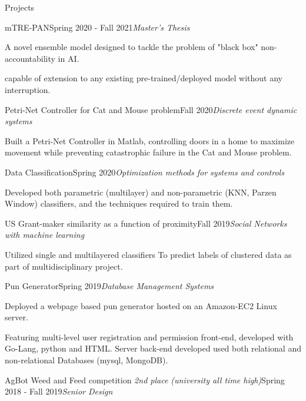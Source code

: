 \documentclass{resume}
\begin{document}



% 
% 
\begin{rSection}{Projects}
\begin{rSubsection}{mTRE-PAN}{Spring 2020 - Fall 2021}{\em Master's Thesis}{}
 \item A novel ensemble model designed to tackle the problem of "black box" non-accountability in AI.
 \item capable of extension to any existing pre-trained/deployed model without any interruption.
\end{rSubsection}
\begin{rSubsection}{Petri-Net Controller for Cat and Mouse problem}{Fall 2020}{\em Discrete event dynamic systems}{}
 \item Built a Petri-Net Controller in Matlab, controlling doors in a home to maximize movement while preventing catastrophic failure in the Cat and Mouse problem.
\end{rSubsection}
\begin{rSubsection}{Data Classification}{Spring 2020}{\em Optimization methods for systems and controls}{}
 \item Developed both parametric (multilayer) and non-parametric (KNN, Parzen Window) classifiers, and the techniques required to train them.
\end{rSubsection}
\begin{rSubsection}{US Grant-maker similarity as a function of proximity}{Fall 2019}{\em Social Networks with machine learning}{}
 \item Utilized single and multilayered classifiers To predict labels of clustered data as part of multidisciplinary project.
\end{rSubsection}
\begin{rSubsection}{Pun Generator}{Spring 2019}{\em Database Management Systems}{}
 \item Deployed a webpage based pun generator hosted on an Amazon-EC2 Linux server.
 \item Featuring multi-level user registration and permission front-end, developed with Go-Lang, python and HTML. Server back-end developed used both relational and non-relational Databases (mysql, MongoDB).
\end{rSubsection}
\begin{rSubsection}{AgBot Weed and Feed competition \em{2nd place (university all time high)}}{Spring 2018 - Fall 2019}{\em Senior Design}{}

\end{rSubsection}
\end{rSection}
\end{document}
